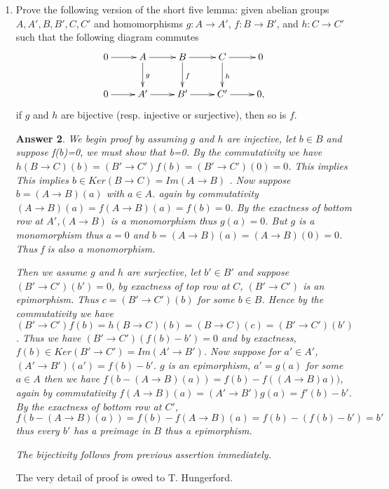 \documentclass[11pt,leqno]{article}
\newcommand{\<}[1]{{\langle}#1 {\rangle}}
\theoremstyle{plain}
\newtheorem*{answer*}{Answer}
\theoremstyle{definition}
\theoremstyle{remark}
\numberwithin{equation}{section}
\begin{document}
\begin{enumerate}
\begin{answer*}
    ii) group $A$ will for sure be $p$-divisible, and split on $p$-kernel. 
    \end{answer*}


\item Prove the following version of the short five lemma: given abelian groups $A,A',B,B',C,C'$ and homomorphisms $g: A \to A'$, $f: B \to B'$, and $h: C \to C'$ such that the following diagram commutes
    \[
    \xymatrix{
    0 \ar[r] & A \ar[r]\ar[d]^{g} & \ar[r]\ar[d]^{f} B & \ar[r]\ar[d]^{h} C & 0 \\
    0 \ar[r] & A' \ar[r] & B' \ar[r] & C'\ar[r] & 0,
    }
    \]
    if $g$ and $h$ are bijective (resp. injective or surjective), then so is $f$.
    \begin{answer*}
    We begin proof by assuming $g$ and $h$ are injective, let $b \in B$ and suppose f(b)=0, we must show that b=0. By the commutativity we have $h(B\rightarrow C)(b)=(B'\rightarrow C')f(b)=(B'\rightarrow C')(0)=0$. This implies This implies $b\in Ker (B\rightarrow C)= Im(A\rightarrow B)$ . Now suppose $b= (A\rightarrow B)(a)$ with $a \in A$. again by commutativity $(A\rightarrow B)(a)=f(A\rightarrow B)(a)=f(b)=0$. By the exactness of bottom row at $A'$,$(A\rightarrow B)$ is a monomorphism thus $g(a)=0$. But $g$ is a monomorphism thus $a=0$ and $b=(A\rightarrow B)(a)=(A\rightarrow B)(0)=0$. Thus f is also a monomorphism.  

    Then we assume $g$ and $h$ are surjective, let $b' \in B'$ and suppose $(B'\rightarrow C')(b')=0$, by exactness of top row at $C$, $(B'\rightarrow C')$ is an epimorphism. Thus $c=(B'\rightarrow C')(b)$ for some $b\in B$. Hence by the commutativity we have $(B'\rightarrow C')f(b)=h(B\rightarrow C)(b)=(B\rightarrow C)(c)=(B'\rightarrow C')(b')$. Thus we have $(B'\rightarrow C')(f(b)-b')=0$ and by exactness, $f(b)\in Ker (B'\rightarrow C')= Im(A'\rightarrow B')$. Now suppose for $a' \in A'$, $(A'\rightarrow B')(a')= f(b)-b'$. $g$ is an epimorphism, $a'=g(a)$ for some $a\in A$ then we have  $f(b-(A\rightarrow B)(a))= f(b)-f((A\rightarrow B)a))$,
    again by commutativity $f(A\rightarrow B)(a)=(A'\rightarrow B')g(a)=f'(b)-b'$. By the exactness of bottom row at $C'$,$f(b-(A\rightarrow B)(a))=f(b)-f(A\rightarrow B)(a) = f(b)-(f(b)-b')=b'$ thus every $b'$ has a preimage in $B$ thus a epimorphism. 
    
    The bijectivity follows from previous assertion immediately.
    \end{answer*}
    The very detail of proof is owed to T. Hungerford.
    

\end{enumerate}
\end{document}
